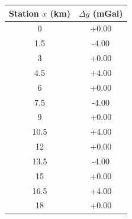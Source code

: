 \begin{tabular}{cc}
\toprule
Station $x$ (km) & $\Delta g$ (mGal) \\
\midrule
0 & +0.00 \\
1.5 & -4.00 \\
3 & +0.00 \\
4.5 & +4.00 \\
6 & +0.00 \\
7.5 & -4.00 \\
9 & +0.00 \\
10.5 & +4.00 \\
12 & +0.00 \\
13.5 & -4.00 \\
15 & +0.00 \\
16.5 & +4.00 \\
18 & +0.00 \\
\bottomrule
\end{tabular}
